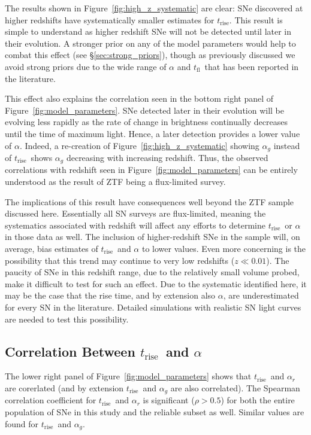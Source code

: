 \documentclass[twocolumn]{aastex63}
\newcommand{\tfl}{$t_\mathrm{fl}$}
\newcommand{\trise}{$t_\mathrm{rise}$}
\begin{document}
The results shown in Figure~\ref{fig:high_z_systematic} are clear: SNe
discovered at higher redshifts have systematically smaller estimates for
\trise. This result is simple to understand as higher redshift SNe will not be
detected until later in their evolution. A stronger prior on any of the model
parameters would help to combat this effect (see \S\ref{sec:strong_priors}),
though as previously discussed we avoid strong priors due to the wide range of
$\alpha$ and \tfl\ that has been reported in the literature. 

This effect also explains the correlation seen in the bottom right panel of
Figure~\ref{fig:model_parameters}. SNe detected later in their evolution will
be evolving less rapidly as the rate of change in brightness continually
decreases until the time of maximum light. Hence, a later detection provides a
lower value of $\alpha$. Indeed, a re-creation of
Figure~\ref{fig:high_z_systematic} showing $\alpha_g$ instead of \trise\ shows
$\alpha_g$ decreasing with increasing redshift. Thus, the observed
correlations with redshift seen in Figure~\ref{fig:model_parameters} can be
entirely understood as the result of ZTF being a flux-limited survey.

The implications of this result have consequences well beyond the ZTF sample
discussed here. Essentially all SN surveys are flux-limited, meaning the
systematics associated with redshift will affect any efforts to determine
\trise\ or $\alpha$ in those data as well. The inclusion of higher-redshift
SNe in the sample will, on average, bias estimates of \trise\ and $\alpha$ to
lower values. Even more concerning is the possibility that this trend may
continue to very low redshifts ($z \ll 0.01$). The paucity of SNe in this
redshift range, due to the relatively small volume probed, make it difficult
to test for such an effect. Due to the systematic identified here, it may be
the case that the rise time, and by extension also $\alpha$, are
underestimated for every SN in the literature. Detailed simulations with
realistic SN light curves are needed to test this possibility.

\subsection{Correlation Between \trise\ and $\alpha$}

The lower right panel of Figure~\ref{fig:model_parameters} shows that \trise\
and $\alpha_r$ are corerlated (and by extension \trise\ and $\alpha_g$ are
also correlated). The Spearman correlation coefficient for \trise\ and
$\alpha_r$ is significant ($\rho > 0.5$) for both the entire population of SNe
in this study and the reliable subset as well. Similar values are found for
\trise\ and $\alpha_g$.
\end{document}
